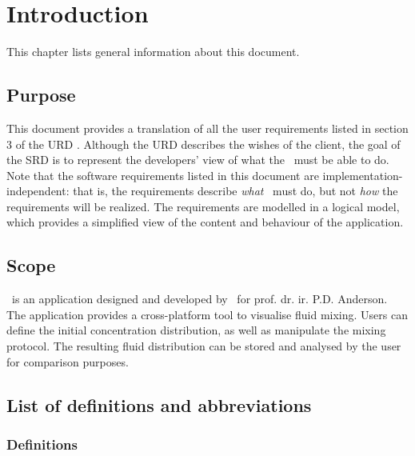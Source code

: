 \chapter{Introduction}
This chapter lists general information about this document.

\section{Purpose}
This document provides a translation of all the user requirements listed in section 3 of the URD \cite{urd}. Although the URD describes the wishes of the client, the goal of the SRD is to represent the developers' view of what the \applicationname\ must be able to do. \\
Note that the software requirements listed in this document are implementation-independent: that is, the requirements describe \emph{what} \projectname\ must do, but not \emph{how} the requirements will be realized. The requirements are modelled in a logical model, which provides a simplified view of the content and behaviour of the application.

\section{Scope}
\projectname\ is an application designed and developed by \projectauthor\ for prof. dr. ir. P.D. Anderson. The application provides a cross-platform tool to visualise fluid mixing. Users can define the initial concentration distribution, as well as manipulate the mixing protocol. The resulting fluid distribution can be stored and analysed by the user for comparison purposes. \\

\section{List of definitions and abbreviations}

\subsection{Definitions}


